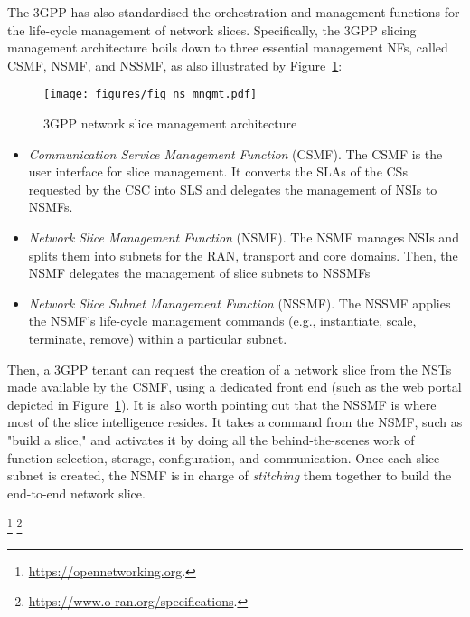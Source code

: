The 3GPP has also standardised the orchestration and management functions for the life-cycle management of network slices. Specifically, the 3GPP slicing management architecture boils down to three essential management NFs, called CSMF, NSMF, and NSSMF, as also illustrated by Figure~\ref{fig:ns_mngmt}: 
%
\begin{figure}[ht]
\centering
\texttt{[image: figures/fig\_ns\_mngmt.pdf]}
\caption{3GPP network slice management architecture}
\label{fig:ns_mngmt}
\end{figure}
%
\renewcommand\labelitemi{$\bullet$}
\begin{itemize}[noitemsep,topsep=2pt]
    \item \textit{Communication Service Management Function} (CSMF). The CSMF is the user interface for slice management. It converts the SLAs of the CSs requested by the CSC into SLS and delegates the management of NSIs to NSMFs.
    \item \textit{Network Slice Management Function} (NSMF). The NSMF  manages NSIs and splits them into subnets for the RAN, transport and core domains. Then, the NSMF delegates the management of slice subnets to NSSMFs
    \item \textit{Network Slice Subnet Management Function} (NSSMF). The NSSMF applies the NSMF's life-cycle management commands (e.g., instantiate, scale, terminate, remove) within a particular subnet. 
\end{itemize}
%
Then, a 3GPP tenant can request the creation of a network slice from the NSTs made available by the CSMF, using a dedicated front end (such as the web portal depicted in Figure~\ref{fig:ns_mngmt}). It is also worth pointing out that the NSSMF is where most of the slice intelligence resides. It takes a command from the NSMF, such as "build a slice," and activates it by doing all the behind-the-scenes work of function selection, storage, configuration, and communication. Once each slice subnet is created, the NSMF is in charge of \textit{stitching} them together to build the end-to-end network slice.

\footnote{\url{https://opennetworking.org}.} \footnote{\url{https://www.o-ran.org/specifications}.}  

